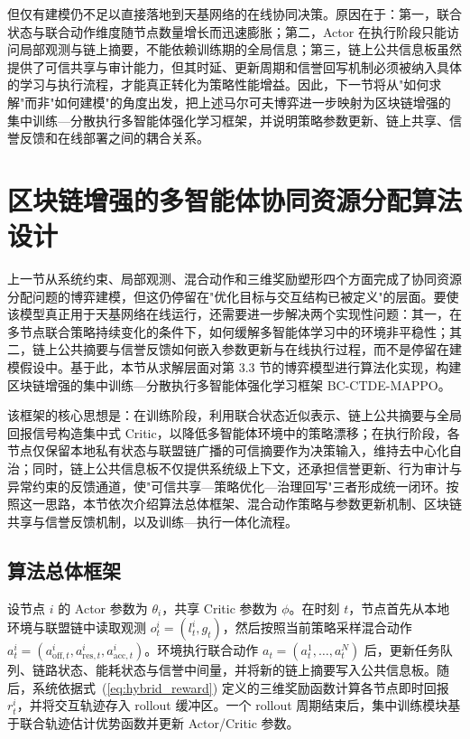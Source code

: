 但仅有建模仍不足以直接落地到天基网络的在线协同决策。原因在于：第一，联合状态与联合动作维度随节点数量增长而迅速膨胀；第二，Actor 在执行阶段只能访问局部观测与链上摘要，不能依赖训练期的全局信息；第三，链上公共信息板虽然提供了可信共享与审计能力，但其时延、更新周期和信誉回写机制必须被纳入具体的学习与执行流程，才能真正转化为策略性能增益。因此，下一节将从"如何求解"而非"如何建模"的角度出发，把上述马尔可夫博弈进一步映射为区块链增强的集中训练—分散执行多智能体强化学习框架，并说明策略参数更新、链上共享、信誉反馈和在线部署之间的耦合关系。

\section{区块链增强的多智能体协同资源分配算法设计}

上一节从系统约束、局部观测、混合动作和三维奖励塑形四个方面完成了协同资源分配问题的博弈建模，但这仍停留在"优化目标与交互结构已被定义"的层面。要使该模型真正用于天基网络在线运行，还需要进一步解决两个实现性问题：其一，在多节点联合策略持续变化的条件下，如何缓解多智能体学习中的环境非平稳性；其二，链上公共摘要与信誉反馈如何嵌入参数更新与在线执行过程，而不是停留在建模假设中。基于此，本节从求解层面对第 3.3 节的博弈模型进行算法化实现，构建区块链增强的集中训练—分散执行多智能体强化学习框架 BC-CTDE-MAPPO。

该框架的核心思想是：在训练阶段，利用联合状态近似表示、链上公共摘要与全局回报信号构造集中式 Critic，以降低多智能体环境中的策略漂移；在执行阶段，各节点仅保留本地私有状态与联盟链广播的可信摘要作为决策输入，维持去中心化自治；同时，链上公共信息板不仅提供系统级上下文，还承担信誉更新、行为审计与异常约束的反馈通道，使"可信共享—策略优化—治理回写"三者形成统一闭环。按照这一思路，本节依次介绍算法总体框架、混合动作策略与参数更新机制、区块链共享与信誉反馈机制，以及训练—执行一体化流程。

\subsection{算法总体框架}

设节点 $i$ 的 Actor 参数为 $\theta_i$，共享 Critic 参数为 $\phi$。在时刻 $t$，节点首先从本地环境与联盟链中读取观测 $o_t^i=(l_t^i,g_t)$，然后按照当前策略采样混合动作 $a_t^i=(a_{\mathrm{off},t}^i,a_{\mathrm{res},t}^i,a_{\mathrm{acc},t}^i)$。环境执行联合动作 $a_t=(a_t^1,\ldots,a_t^N)$ 后，更新任务队列、链路状态、能耗状态与信誉中间量，并将新的链上摘要写入公共信息板。随后，系统依据式~(\ref{eq:hybrid_reward}) 定义的三维奖励函数计算各节点即时回报 $r_t^i$，并将交互轨迹存入 rollout 缓冲区。一个 rollout 周期结束后，集中训练模块基于联合轨迹估计优势函数并更新 Actor/Critic 参数。

